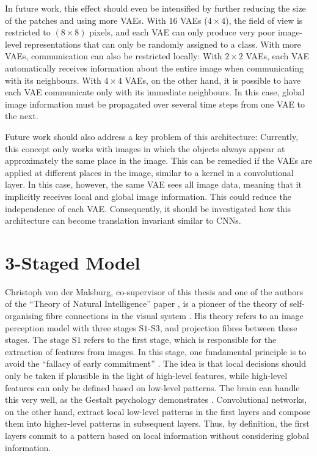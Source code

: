 In future work, this effect should even be intensified by further reducing the size of the patches and using more VAEs. With $16$ VAEs ($4\times4$), the field of view is restricted to $(8 \times 8)$ pixels, and each VAE can only produce very poor image-level representations that can only be randomly assigned to a class. With more VAEs, communication can also be restricted locally: With $2\times2$ VAEs, each VAE automatically receives information about the entire image when communicating with its neighbours. With $4\times4$ VAEs, on the other hand, it is possible to have each VAE communicate only with its immediate neighbours. In this case, global image information must be propagated over several time steps from one VAE to the next.

Future work should also address a key problem of this architecture: Currently, this concept only works with images in which the objects always appear at approximately the same place in the image. This can be remedied if the VAEs are applied at different places in the image, similar to a kernel in a convolutional layer. In this case, however, the same VAE sees all image data, meaning that it implicitly receives local and global image information. This could reduce the independence of each VAE. Consequently, it should be investigated how this architecture can become translation invariant similar to CNNs.


\section{3-Staged Model}
Christoph von der Malsburg, co-supervisor of this thesis and one of the authors of the ``Theory of Natural Intelligence'' paper , is a pioneer of the theory of self-organising fibre connections in the visual system . His theory refers to an image perception model with three stages S$1$-S$3$, and projection fibres between these stages.
The stage S$1$ refers to the first stage, which is responsible for the extraction of features from images. In this stage, one fundamental principle is to avoid the ``fallacy of early commitment'' .
The idea is that local decisions should only be taken if plausible in the light of high-level features, while high-level features can only be defined based on low-level patterns.
The brain can handle this very well, as the Gestalt psychology demonstrates .
Convolutional networks, on the other hand, extract local low-level patterns in the first layers and compose them into higher-level patterns in subsequent layers. Thus, by definition, the first layers commit to a pattern based on local information without considering global information.

